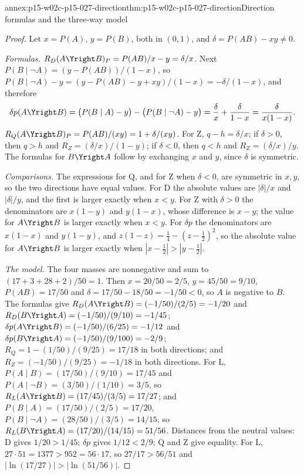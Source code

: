 \begin{annexitem}{annex:p15-w02c-p15-027-direction}{thm:p15-w02c-p15-027-direction}{Direction formulas and the three-way model}
\begin{proof}
Let \(x=P(A)\), \(y=P(B)\), both in \((0,1)\), and
\(\delta=P(AB)-xy\ne0\).

\emph{Formulas.} \(R_D(A\Yright B)_P=P(AB)/x-y=\delta/x\).
Next \(P(B\mid\neg A)=(y-P(AB))/(1-x)\), so
\(P(B\mid\neg A)-y=(y-P(AB)-y+xy)/(1-x)=-\delta/(1-x)\), and therefore
\[
 \delta p(A\Yright B)=\bigl(P(B\mid A)-y\bigr)-\bigl(P(B\mid\neg A)-y\bigr)
 =\frac{\delta}{x}+\frac{\delta}{1-x}=\frac{\delta}{x(1-x)}.
\]
\(R_Q(A\Yright B)_P=P(AB)/(xy)=1+\delta/(xy)\). For Z,
\(q-h=\delta/x\); if \(\delta>0\), then \(q>h\) and
\(R_Z=(\delta/x)/(1-y)\); if \(\delta<0\), then \(q<h\) and
\(R_Z=(\delta/x)/y\). The formulas for \(B\Yright A\) follow by
exchanging \(x\) and \(y\), since \(\delta\) is symmetric.

\emph{Comparisons.} The expressions for Q, and for Z when \(\delta<0\),
are symmetric in \(x,y\), so the two directions have equal values. For
D the absolute values are \(|\delta|/x\) and \(|\delta|/y\), and the
first is larger exactly when \(x<y\). For Z with \(\delta>0\) the
denominators are \(x(1-y)\) and \(y(1-x)\), whose difference is
\(x-y\); the value for \(A\Yright B\) is larger exactly when \(x<y\).
For \(\delta p\) the denominators are \(x(1-x)\) and \(y(1-y)\), and
\(z(1-z)=\tfrac14-(z-\tfrac12)^2\), so the absolute value for
\(A\Yright B\) is larger exactly when \(|x-\tfrac12|>|y-\tfrac12|\).

\emph{The model.} The four masses are nonnegative and sum to
\((17+3+28+2)/50=1\). Then \(x=20/50=2/5\), \(y=45/50=9/10\),
\(P(AB)=17/50\) and \(\delta=17/50-18/50=-1/50<0\), so \(A\) is negative
to \(B\). The formulas give
\(R_D(A\Yright B)=(-1/50)/(2/5)=-1/20\) and
\(R_D(B\Yright A)=(-1/50)/(9/10)=-1/45\);
\(\delta p(A\Yright B)=(-1/50)/(6/25)=-1/12\) and
\(\delta p(B\Yright A)=(-1/50)/(9/100)=-2/9\);
\(R_Q=1-(1/50)/(9/25)=17/18\) in both directions; and
\(R_Z=(-1/50)/(9/25)=-1/18\) in both directions. For L,
\(P(A\mid B)=(17/50)/(9/10)=17/45\) and
\(P(A\mid\neg B)=(3/50)/(1/10)=3/5\), so
\(R_L(A\Yright B)=(17/45)/(3/5)=17/27\); and
\(P(B\mid A)=(17/50)/(2/5)=17/20\),
\(P(B\mid\neg A)=(28/50)/(3/5)=14/15\), so
\(R_L(B\Yright A)=(17/20)/(14/15)=51/56\). Distances from the neutral
values: D gives \(1/20>1/45\); \(\delta p\) gives \(1/12<2/9\); Q and Z
give equality. For L, \(27\cdot51=1377>952=56\cdot17\), so
\(27/17>56/51\) and \(|\ln(17/27)|>|\ln(51/56)|\).
\end{proof}
\end{annexitem}

